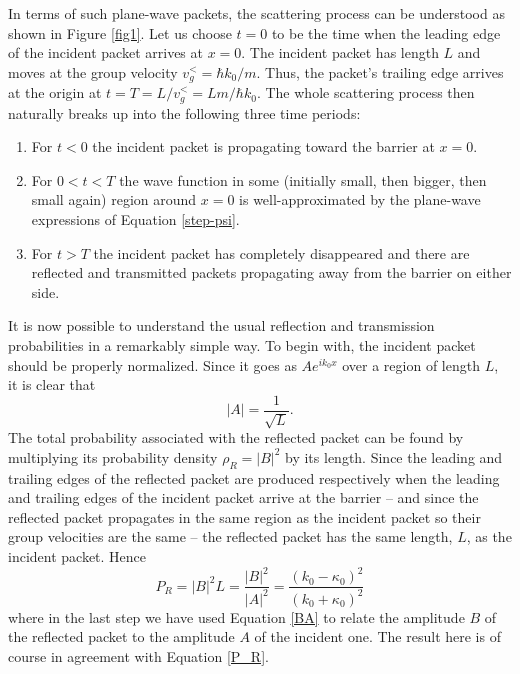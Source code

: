 \documentclass[aps,prc,twocolumn,letterpaper,floatfix]{revtex4}
\begin{document}
In terms of such plane-wave packets, the scattering process can be
understood as shown in Figure \ref{fig1}.  Let us choose $t=0$ to be
the time when the leading edge of the incident packet arrives at
$x=0$.  The incident packet has length $L$
and moves at the group velocity $v_g^< = \hbar k_0 / m$.  Thus, the
packet's trailing edge arrives at the origin at $t = T = L/v_g^< = Lm/\hbar
k_0$.  The whole scattering process then naturally breaks up into the
following three time periods:
\begin{enumerate}
\item For $t<0$ the incident packet is propagating toward the barrier
  at $x=0$.
\item For $0 < t < T$ the wave function in some
  (initially small, then bigger, then small again) region around $x=0$
  is well-approximated by the plane-wave expressions of Equation
  \eqref{step-psi}.  
\item For $t > T$ the incident packet has completely
  disappeared and there are reflected and transmitted packets
  propagating away from the barrier on either side.
\end{enumerate}
It is now possible to understand the usual reflection and transmission
probabilities in a remarkably simple way.  To begin with, the
incident packet should be properly normalized.  Since it goes as $A
e^{i k_0 x}$ over a region of length $L$, it is clear that 
\begin{equation}
|A| = \frac{1}{\sqrt{L}}.
\end{equation}
The total probability associated with the reflected packet can be
found by multiplying its probability density $\rho_R = |B|^2$ by its
length.  Since the leading and trailing edges of the reflected packet
are produced respectively when the leading and trailing edges of
the incident packet arrive at the barrier -- and since the reflected
packet propagates in the same region as the incident packet so their
group velocities are the same -- the reflected packet has the same
length, $L$, as the incident packet.  Hence
\begin{equation}
P_R = |B|^2 L =\frac{|B|^2}{|A|^2} =
\frac{(k_0-\kappa_0)^2}{(k_0+\kappa_0)^2}
\end{equation}
where in the last step we have used Equation \eqref{BA} to relate the amplitude $B$ of
the reflected packet to the amplitude $A$ of the incident one. 
The result here is of course in agreement with Equation \eqref{P_R}.  
\end{document}
